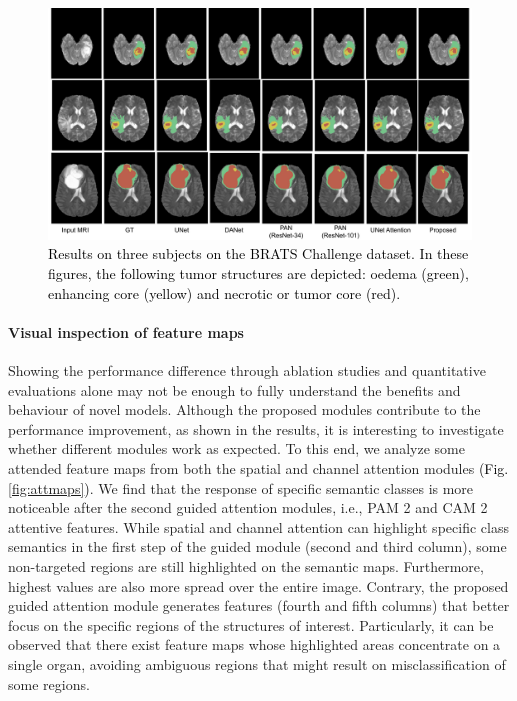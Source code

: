 \documentclass[journal]{IEEEtran}
\begin{document}
\begin{figure}[h!]
    \centering
    \includegraphics[width=1\textwidth]{BRATS_vis.pdf}
    \caption{\textcolor{black}{Results on three subjects on the BRATS Challenge dataset. In these figures, the following tumor structures are depicted: oedema (green), enhancing core (yellow) and necrotic or tumor core (red).}}
        \label{fig:visualImagesBRATS}
\end{figure}

\paragraph*{\textbf{Visual inspection of feature maps}}

Showing the performance difference through ablation studies and quantitative evaluations alone may not be enough to fully understand the benefits and behaviour of novel models. Although the proposed modules contribute to the performance improvement, as shown in the results, it is interesting to investigate whether different modules work as expected. To this end, we analyze some attended feature maps from both the spatial and channel attention modules \textcolor{black}{(Fig. \ref{fig:attmaps})}. We find that the response of specific semantic classes is more noticeable after the second guided attention modules, i.e., PAM 2 and CAM 2 attentive features. While spatial and channel attention can highlight specific class semantics in the first step of the guided module (second and third column), some non-targeted regions are still highlighted on the semantic maps. Furthermore, highest values are also more spread over the entire image. Contrary, the proposed guided attention module generates features (fourth and fifth columns) that better focus on the specific regions of the structures of interest. Particularly, it can be observed that there exist feature maps whose highlighted areas concentrate on a single organ, avoiding ambiguous regions that might result on misclassification of some regions.
\end{document}
